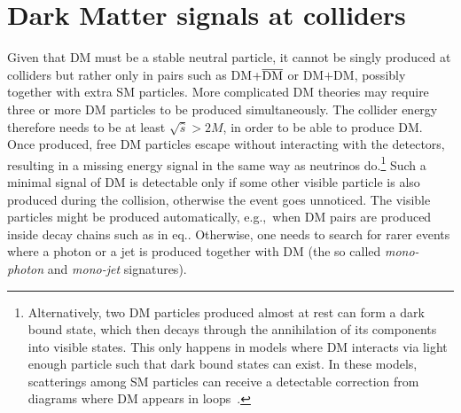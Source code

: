 \section{Dark Matter signals at colliders}\label{sec:DMatcolliders}
Given that DM must be a stable neutral particle, it cannot be singly produced at colliders but rather only in pairs such as DM$+\overline{\rm DM}$  or DM$+$DM, possibly together with extra SM particles.
More complicated DM theories may require three or more DM particles to be produced simultaneously.
The collider energy therefore needs to be at least  $\sqrt{\hat s}>2 M$, in order to be able to produce DM.  Once produced, free DM particles
escape without interacting with the detectors, resulting in a missing energy signal in the same way as neutrinos do.\footnote{Alternatively,
two DM particles produced almost at rest can form a dark bound state, which then decays through the annihilation
of its components into visible states. This only happens in models where DM interacts via light enough particle such that dark bound states can exist.
In these models, scatterings among SM particles can receive a detectable correction from
diagrams where DM appears in loops~\cite{DMboundstatecollider}.}
Such a minimal signal of DM is detectable only if some other visible particle is also produced during the collision,
otherwise the event goes unnoticed.
The visible particles might be produced automatically, e.g.,\ when DM pairs are produced
inside decay chains such as in eq.. Otherwise, one needs
to search for rarer events where a photon or a jet is produced together with DM (the so called {\em mono-photon} and {\em mono-jet} signatures).


